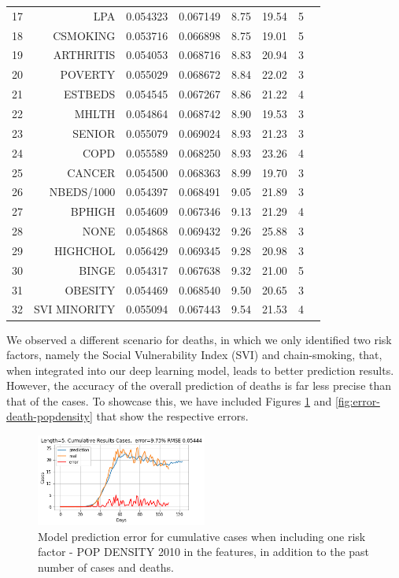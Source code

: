 \documentclass[letterpaper, inpress]{jds} %
\renewcommand{\_}{%
    \textunderscore\hspace{0pt}%
}
\begin{document}
\begin{table}[!p]
\begin{tabular}{rrrrrlrl}
17 & LPA & 0.054323 & 0.067149 & 8.75 & 19.54 & 5 \\
18 & CSMOKING & 0.053716 & 0.066898 & 8.75 & 19.01 & 5 \\
19 & ARTHRITIS & 0.054053 & 0.068716 & 8.83 & 20.94 & 3 \\
20 & POVERTY & 0.055029 & 0.068672 & 8.84 & 22.02 & 3 \\
21 & ESTBEDS & 0.054545 & 0.067267 & 8.86 & 21.22 & 4 \\
22 & MHLTH & 0.054864 & 0.068742 & 8.90 & 19.53 & 3 \\
23 & SENIOR & 0.055079 & 0.069024 & 8.93 & 21.23 & 3 \\
24 & COPD & 0.055589 & 0.068250 & 8.93 & 23.26 & 4 \\
25 & CANCER & 0.054500 & 0.068363 & 8.99 & 19.70 & 3 \\
26 & NBEDS/1000 & 0.054397 & 0.068491 & 9.05 & 21.89 & 3 \\
27 & BPHIGH & 0.054609 & 0.067346 & 9.13 & 21.29 & 4 \\
\rowcolor{black!5} 28 & NONE & 0.054868 & 0.069432 & 9.26 & 25.88 & 3 \\
29 & HIGHCHOL & 0.056429 & 0.069345 & 9.28 & 20.98 & 3 \\
30 & BINGE & 0.054317 & 0.067638 & 9.32 & 21.00 & 5 \\
31 & OBESITY & 0.054469 & 0.068540 & 9.50 & 20.65 & 3 \\
32 & SVI\_MINORITY & 0.055094 & 0.067443 & 9.54 & 21.53 & 4 \\
\bottomrule
\end{tabular}
\end{table}

We observed a different scenario for deaths, in which we only
identified two risk factors, namely the Social Vulnerability Index
(SVI) and chain-smoking, that, when integrated into our deep learning
model, leads to better prediction results. However, the accuracy of
the overall prediction of deaths is far less precise than that of the
cases. To showcase this, we have included Figures
\ref{fig:error-case-popdensity} and \ref{fig:error-death-popdensity}
that show the respective errors.

\begin{figure}[!h]
    \centering
    \includegraphics[width=0.5\textwidth]{images/predict/Length_5-fields_pop_density_2010-Cumulative-Cases.png}
    \caption{Model prediction error for cumulative cases when
      including one risk factor - POP\_DENSITY\_2010 in the features,
      in addition to the past number of cases and deaths.}
    \label{fig:error-case-popdensity}
\end{figure}
    
\end{document}
